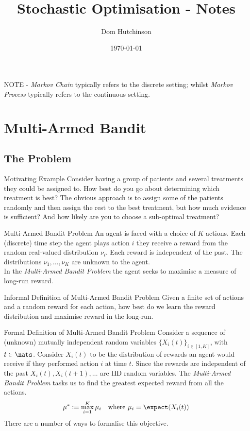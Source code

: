 \documentclass[11pt,a4paper]{article}
\begin{document}
\title{Stochastic Optimisation - Notes}
\author{Dom Hutchinson}
\date{\today}
\maketitle

NOTE - \textit{Markov Chain} typically refers to the discrete setting; whilst \textit{Markov Process} typically refers to the continuous setting.

\tableofcontents\newpage

\section{Multi-Armed Bandit}

\subsection{The Problem}

  \begin{example}{Motivating Example}
    Consider having a group of patients and several treatments they could be assigned to. How best do you go about determining which treatment is best? The obvious approach is to assign some of the patients randomly and then assign the rest to the best treatment, but how much evidence is sufficient? And how likely are you to choose a sub-optimal treatment?
  \end{example}

  \begin{definition}{Multi-Armed Bandit Problem}
     An agent is faced with a choice of $K$ actions. Each (discrete) time step the agent plays action $i$ they receive a reward from the random real-valued distribution $\nu_i$. Each reward is independent of the past. The distributions $\nu_1,\dots,\nu_K$ are unknown to the agent.\\
     In the \textit{Multi-Armed Bandit Problem} the agent seeks to maximise a measure of long-run reward.
  \end{definition}

  \begin{remark}{Informal Definition of Multi-Armed Bandit Problem}
    Given a finite set of actions and a random reward for each action, how best do we learn the reward distribution and maximise reward in the long-run.
  \end{remark}

  \begin{definition}{Formal Definition of Multi-Armed Bandit Problem}
    Consider a sequence of (unknown) mutually independent random variables $\{X_i(t)\}_{i\in[1,K]}$, with $t\in\nats$. Consider $X_i(t)$ to be the distribution of rewards an agent would receive if they performed action $i$ at time $t$. Since the rewards are independent of the past $X_i(t),X_i(t+1),\dots$ are IID random variables. The \textit{Multi-Armed Bandit Problem} tasks us to find the greatest expected reward from all the actions.
    \[ \mu^*:=\max_{i=1}^K\mu_i\quad\text{where }\mu_i=\expect(X_i(t)) \]
    There are a number of ways to formalise this objective.
  \end{definition}
\end{document}
